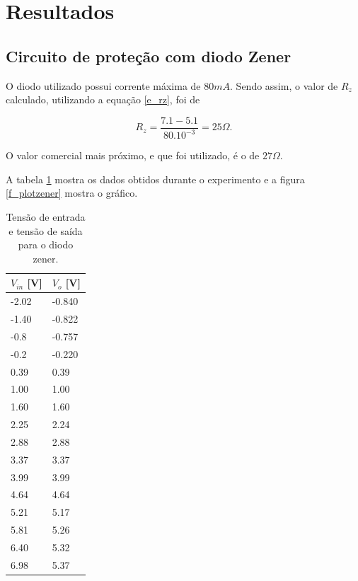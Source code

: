 \newpage
\section{Resultados}

\subsection{Circuito de proteção com diodo Zener}
O diodo utilizado possui corrente máxima de $80mA$. Sendo assim, o valor de $R_z$ calculado, utilizando a equação \ref{e_rz}, foi de

\[ R_z = \frac{7.1 - 5.1}{80.10^{-3}} = 25 \Omega.\]

O valor comercial mais próximo, e que foi utilizado, é o de $27\Omega$.

A tabela \ref{t_zener} mostra os dados obtidos durante o experimento e a figura \ref{f_plotzener} mostra o gráfico.

\begin{small}
	\begin{table}[H]
		\begin{center}
			\caption{Tensão de entrada e tensão de saída para o diodo zener.}
			\begin{tabular}{l|l}
				\hline
				$V_{in}$ [V] & $V_o$ [V] \\
				\hline
				-2.02  & -0.840 \\
				\hline
				-1.40  & -0.822 \\
				\hline
				-0.8  & -0.757 \\
				\hline
				-0.2  & -0.220 \\
				\hline
				0.39  & 0.39 \\
				\hline
				1.00  & 1.00 \\
				\hline
				1.60  & 1.60 \\
				\hline
				2.25  & 2.24 \\
				\hline
				2.88  & 2.88 \\
				\hline
				3.37  & 3.37 \\
				\hline
				3.99  & 3.99 \\
				\hline
				4.64 & 4.64 \\
				\hline
				5.21 & 5.17 \\
				\hline
				5.81 & 5.26 \\
				\hline
				6.40 & 5.32 \\
				\hline
				6.98 & 5.37 \\
				\hline
			\end{tabular}
			\label{t_zener}
		\end{center}
	\end{table}
\end{small}


